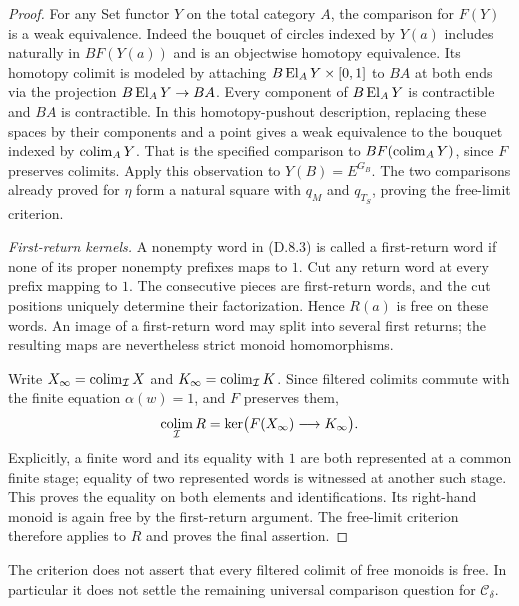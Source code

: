 \begin{proof}
For any Set functor $Y$ on the total category $A$, the comparison
for $F(Y)$ is a weak equivalence. Indeed the bouquet of circles
indexed by $Y(a)$ includes naturally in $BF(Y(a))$ and is an
objectwise homotopy equivalence. Its homotopy colimit is modeled
by attaching $B\operatorname{El}_A Y\times[0,1]$ to $BA$ at both ends via
the projection $B\operatorname{El}_A Y\to BA$. Every component of
$B\operatorname{El}_A Y$ is contractible and $BA$ is contractible. In this
homotopy-pushout description, replacing these spaces by their
components and a point gives a weak equivalence to the bouquet
indexed by $\operatorname*{colim}_A Y$. That is the specified comparison to
$BF(\operatorname*{colim}_A Y)$, since $F$ preserves colimits.
Apply this observation to $Y(B)=E^{G_B}$. The two comparisons
already proved for $\eta$ form a natural square with $q_M$ and
$q_{T_S}$, proving the free-limit criterion.

\emph{First-return kernels.}
A nonempty word in (D.8.3) is called a first-return word if none
of its proper nonempty prefixes maps to $1$. Cut any return word
at every prefix mapping to $1$. The consecutive pieces are
first-return words, and the cut positions uniquely determine
their factorization. Hence $R(a)$ is free on these words.
An image of a first-return word may split into several first
returns; the resulting maps are nevertheless strict monoid
homomorphisms.

Write $X_\infty=\operatorname*{colim}_{\mathcal I}X$ and
$K_\infty=\operatorname*{colim}_{\mathcal I}K$. Since filtered colimits commute
with the finite equation $\alpha(w)=1$, and $F$ preserves them,
\[
 \operatorname*{colim}_{\mathcal I}R
   =\ker\bigl(F(X_\infty)\longrightarrow K_\infty\bigr).
\]
Explicitly, a finite word and its equality with $1$ are both
represented at a common finite stage; equality of two represented
words is witnessed at another such stage. This proves the equality
on both elements and identifications. Its right-hand monoid is
again free by the first-return argument. The free-limit criterion
therefore applies to $R$ and proves the final assertion.
\end{proof}

The criterion does not assert that every filtered colimit of free
monoids is free. In particular it does not settle the remaining
universal comparison question for $\mathcal C_\delta$.
